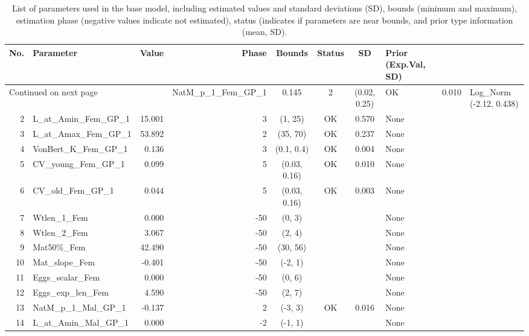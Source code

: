 \documentclass[12pt,]{article}
\begin{document}
\begin{landscape}
\begin{longtable}{rlrrcccl}
\caption{List of parameters used in
                                              the base model, including estimated 
                                              values and standard deviations (SD), 
                                              bounds (minimum and maximum), 
                                              estimation phase (negative values indicate
                                              not estimated), status (indicates if 
                                              parameters are near bounds, and prior type
                                              information (mean, SD).} \\ 
  \hline
No. & Parameter & Value & Phase & Bounds & Status & SD & Prior (Exp.Val, SD)  \\ 
  \hline 
\endhead 
\hline 
\multicolumn{3}{l}{\footnotesize Continued on next page} 
\endfoot 
\endlastfoot 
 \hline
1 & NatM\_p\_1\_Fem\_GP\_1 & 0.145 & 2 & (0.02, 0.25) & OK & 0.010 & Log\_Norm (-2.12, 0.438) \\ 
  2 & L\_at\_Amin\_Fem\_GP\_1 & 15.001 & 3 & (1, 25) & OK & 0.570 & None \\ 
  3 & L\_at\_Amax\_Fem\_GP\_1 & 53.892 & 2 & (35, 70) & OK & 0.237 & None \\ 
  4 & VonBert\_K\_Fem\_GP\_1 & 0.136 & 3 & (0.1, 0.4) & OK & 0.004 & None \\ 
  5 & CV\_young\_Fem\_GP\_1 & 0.099 & 5 & (0.03, 0.16) & OK & 0.010 & None \\ 
  6 & CV\_old\_Fem\_GP\_1 & 0.044 & 5 & (0.03, 0.16) & OK & 0.003 & None \\ 
  7 & Wtlen\_1\_Fem & 0.000 & -50 & (0, 3) &  &  & None \\ 
  8 & Wtlen\_2\_Fem & 3.067 & -50 & (2, 4) &  &  & None \\ 
  9 & Mat50\%\_Fem & 42.490 & -50 & (30, 56) &  &  & None \\ 
  10 & Mat\_slope\_Fem & -0.401 & -50 & (-2, 1) &  &  & None \\ 
  11 & Eggs\_scalar\_Fem & 0.000 & -50 & (0, 6) &  &  & None \\ 
  12 & Eggs\_exp\_len\_Fem & 4.590 & -50 & (2, 7) &  &  & None \\ 
  13 & NatM\_p\_1\_Mal\_GP\_1 & -0.137 & 2 & (-3, 3) & OK & 0.016 & None \\ 
  14 & L\_at\_Amin\_Mal\_GP\_1 & 0.000 & -2 & (-1, 1) &  &  & None \\ 

\end{longtable}
\end{landscape}
\end{document}
